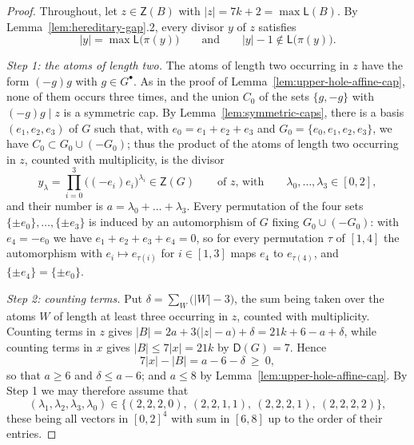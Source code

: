 \documentclass[a4paper, 10pt]{amsart}
\theoremstyle{plain}
\theoremstyle{definition}
\theoremstyle{definition}
\numberwithin{equation}{section}
\begin{document}
\begin{proof}
Throughout, let $z \in \mathsf Z(B)$ with $|z| = 7k+2 = \max \mathsf L (B)$.
By  Lemma~\ref{lem:hereditary-gap}.2, every divisor $y$ of $z$ satisfies
\begin{equation}
 |y| = \max \mathsf L \big(\pi (y) \big)
 \qquad \text{and} \qquad
 |y|-1 \notin \mathsf L \big(\pi (y) \big) .\label{eq:doubled-cap-cubes-local}
\end{equation}

\smallskip
\noindent
\emph{Step 1: the atoms of length two.}  The atoms of length two occurring
in $z$ have the form $(-g)g$ with $g \in G^{\bullet}$.  As in the proof of
Lemma~\ref{lem:upper-hole-affine-cap}, none of them occurs three times, and
the union $C_0$ of the sets $\{g,-g\}$ with $(-g)g \mid z$ is
a symmetric cap.  By Lemma~\ref{lem:symmetric-caps}, there is a basis
$(e_1,e_2,e_3)$ of $G$ such that, with $e_0 = e_1+e_2+e_3$ and
$G_0 = \{e_0,e_1,e_2,e_3\}$, we have $C_0 \subset G_0 \cup (-G_0)$; thus the
product of the atoms of length two occurring in $z$, counted with
multiplicity, is the divisor
\[
 y_{\lambda} = \prod_{i=0}^{3}\bigl((-e_i)e_i\bigr)^{\lambda_i} \in \mathsf Z (G)
 \qquad \text{of $z$, with} \qquad \lambda_0, \ldots, \lambda_3 \in [0,2] ,
\]
and their number is $a = \lambda_0+\ldots+\lambda_3$.  Every permutation of
the four sets $\{\pm e_0\}, \ldots, \{\pm e_3\}$ is induced by an automorphism
of $G$ fixing $G_0 \cup (-G_0)$: with $e_4 = -e_0$ we have
$e_1+e_2+e_3+e_4 = 0$, so for every permutation $\tau$ of $[1,4]$ the
automorphism with $e_i \mapsto e_{\tau(i)}$ for $i \in [1,3]$ maps $e_4$ to
$e_{\tau(4)}$, and $\{\pm e_4\} = \{\pm e_0\}$.

\smallskip
\noindent
\emph{Step 2: counting terms.}  Put
$\delta = \sum_{W}\bigl(|W|-3\bigr)$, the sum being taken over the atoms
$W$ of length at least three occurring in $z$, counted with multiplicity.  Counting terms in $z$ gives
$|B| = 2a+3\bigl(|z|-a\bigr)+\delta = 21k+6-a+\delta$, while counting terms
in $x$ gives $|B| \le 7|x| = 21k$ by $\mathsf D (G) = 7$.  Hence
\begin{equation}
 7|x|-|B| = a-6-\delta \ \ge \ 0 ,\label{eq:doubled-cap-cubes-defect}
\end{equation}
so that $a \ge 6$ and $\delta \le a-6$; and $a \le 8$ by
Lemma~\ref{lem:upper-hole-affine-cap}.  By Step 1 we may therefore assume
that
\[
 (\lambda_1,\lambda_2,\lambda_3,\lambda_0) \in
 \bigl\{ (2,2,2,0),\ (2,2,1,1),\ (2,2,2,1),\ (2,2,2,2) \bigr\} ,
\]
these being all vectors in $[0,2]^4$ with sum in $[6,8]$ up to the order of
their entries.


\end{proof}
\end{document}
